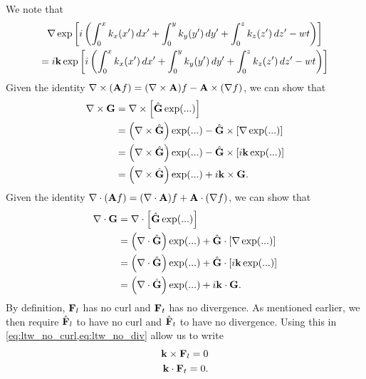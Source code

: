 \documentclass[a4paper,11pt]{report}
\begin{document}
We note that
\begin{multline}
    \nabla \exp \left [ i \left ( \int_0^x k_x(x') \, dx' + \int_0^y k_y(y') \, dy' + \int_0^z k_z(z') \, dz'  - wt \right ) \right ] \\
    = i \mathbf{k} \exp \left [ i \left ( \int_0^x k_x(x') \, dx' + \int_0^y k_y(y') \, dy' + \int_0^z k_z(z') \, dz'  - wt \right ) \right ]
\end{multline}
Given the identity $\nabla \times (\mathbf{A} f) = (\nabla \times \mathbf{A} ) f - \mathbf{A} \times (\nabla f)$, we can show that
\begin{align}
    \label{eq:ltw_no_curl}
    \nabla \times \mathbf{G} &= \nabla \times \left [ \hat{\mathbf{G}} \exp (...) \right ] \nonumber \\
    &= \left ( \nabla \times \hat{\mathbf{G}} \right ) \exp (...) - \hat{\mathbf{G}} \times \left [ \nabla \exp (...) \right ] \nonumber \\
    &= \left ( \nabla \times \hat{\mathbf{G}} \right ) \exp (...) - \hat{\mathbf{G}} \times \left [ i\mathbf{k} \exp (...) \right ] \nonumber \\
    &= \left ( \nabla \times \hat{\mathbf{G}} \right ) \exp (...) + i \mathbf{k} \times \mathbf{G}.
\end{align}
Given the identity $\nabla \cdot (\mathbf{A} f) = ( \nabla \cdot \mathbf{A}) f + \mathbf{A} \cdot (\nabla f)$, we can show that
\begin{align}
    \label{eq:ltw_no_div}
    \nabla \cdot \mathbf{G} &= \nabla \cdot \left [ \hat{\mathbf{G}} \exp (...) \right ] \nonumber \\
    &= \left ( \nabla \cdot \hat{\mathbf{G}} \right ) \exp (...) + \hat{\mathbf{G}} \cdot \left [ \nabla \exp (...) \right ] \nonumber \\
    &= \left ( \nabla \cdot \hat{\mathbf{G}} \right ) \exp (...) + \hat{\mathbf{G}} \cdot \left [ i \mathbf{k} \exp (...) \right ] \nonumber \\
    &= \left ( \nabla \cdot \hat{\mathbf{G}} \right ) \exp (...) + i \mathbf{k} \cdot \mathbf{G}.
\end{align}
By definition, $\mathbf{F}_l$ has no curl and $\mathbf{F}_t$ has no divergence. As mentioned earlier, we then require $\hat{\mathbf{F}}_l$ to have no curl and $\hat{\mathbf{F}}_t$ to have no divergence. Using this in \cref{eq:ltw_no_curl,eq:ltw_no_div} allow us to write
\begin{align}
    \mathbf{k} \times \mathbf{F}_l = 0 \label{eq:ltw_plasma_long_wavevector} \\
    \mathbf{k} \cdot \mathbf{F}_t = 0 \label{eq:ltw_plasma_trans_wavevector}.
\end{align}
\end{document}

